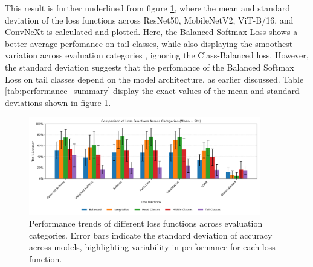 This result is further underlined from figure \ref{fig:loss_comparison_bars}, where the mean and standard deviation of the loss functions across ResNet50, MobileNetV2, ViT-B/16, and ConvNeXt is calculated and plotted. Here, the Balanced Softmax Loss shows a better average perfomance on tail classes, while also displaying the smoothest variation across evaluation categories , ignoring the Class-Balanced loss. However, the standard deviation suggests that the perfomance of the Balanced Softmax Loss on tail classes depend on the model architecture, as earlier discussed. Table \ref{tab:performance_summary} display the exact values of the mean and standard deviations shown in figure \ref{fig:loss_comparison_bars}. 

\begin{figure}[H]
    \centering
    \includegraphics[width=0.9\textwidth]{Images/Plots/loss_function_bar_plot_mean_std.png}
    \caption{Performance trends of different loss functions across evaluation categories. Error bars indicate the standard deviation of accuracy across models, highlighting variability in performance for each loss function.}
    \label{fig:loss_comparison_bars}
\end{figure}



